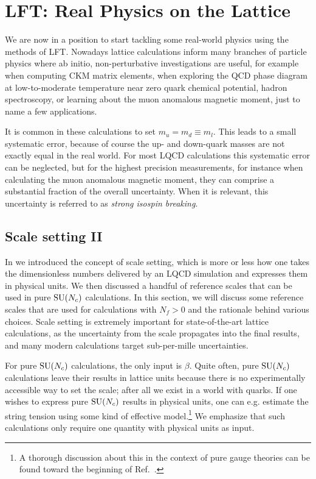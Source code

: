 \chapter{LFT: Real Physics on the Lattice}\label{ch:realPhys}

We are now in a position to start tackling some real-world physics using the
methods of LFT. Nowadays lattice calculations inform many branches of particle
physics where ab initio, non-perturbative investigations are useful, for example
when computing CKM matrix elements, when exploring the QCD phase diagram at
low-to-moderate temperature near zero quark chemical potential, hadron
spectroscopy, or learning about the muon anomalous magnetic moment, just to name
a few applications.

It is common in these calculations to set $m_u=m_d\equiv m_l$.
This leads to a small systematic error, because of course the up-
and down-quark masses are not exactly equal in the real world. For most
LQCD calculations this systematic error can be neglected, but for the
highest precision measurements, for instance when calculating
the muon anomalous magnetic moment, they can comprise a substantial fraction of
the overall uncertainty. When it is relevant, this uncertainty
is referred to as {\it strong isospin breaking}.

\section{Scale setting II}\label{sec:refscalesII}

In  we introduced the concept of scale setting,
which is more or less how one takes the dimensionless numbers delivered by
an LQCD simulation and expresses them in physical units. We then
discussed a handful of reference scales that can be used in pure
$\operatorname{SU}(N_c)$ calculations. In this section, we will discuss some reference scales
that are used for calculations with $N_f>0$ and the rationale behind various
choices. Scale setting is extremely important for state-of-the-art lattice
calculations, as the uncertainty from the scale propagates into the final
results, and many modern calculations target sub-per-mille uncertainties.

For pure $\operatorname{SU}(N_c)$ calculations, the only input is 
$\beta$. Quite often, pure $\operatorname{SU}(N_c)$ calculations leave their results in
lattice units because there is no experimentally accessible way to set the
scale; after all we exist in a world with quarks. If one wishes
to express pure $\operatorname{SU}(N_c)$ results in physical units, one can e.g. estimate
the string tension
using some kind of effective model.\footnote{A thorough discussion about this in
the context of pure gauge theories can be found toward the beginning of
Ref.~\cite{smit_introduction_2002}.} We emphasize that such calculations only
require one quantity with physical units as input.

